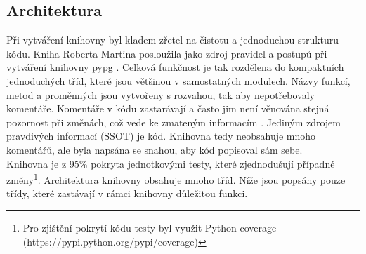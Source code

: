 \documentclass[ing,male,java,dept456]{diploma}						%
\begin{document}
\subsection{Architektura}

Při vytváření knihovny byl kladem zřetel na čistotu a jednoduchou strukturu kódu. Kniha Roberta Martina posloužila jako zdroj pravidel a postupů při vytváření knihovny pypg \cite{cleancode}. Celková funkčnost je tak rozdělena do kompaktních jednoduchých tříd, které jsou většinou v samostatných modulech. Názvy funkcí, metod a proměnných jsou vytvořeny s rozvahou, tak aby nepotřebovaly komentáře. Komentáře v kódu zastarávají a často jim není věnována stejná pozornost při změnách, což vede ke zmateným informacím  \cite{cleancode}. Jediným zdrojem pravdivých informací (SSOT) je kód. Knihovna tedy neobsahuje mnoho komentářů, ale byla napsána se snahou, aby kód popisoval sám sebe. \\
Knihovna je z 95\% pokryta jednotkovými testy, které zjednodušují případné změny\footnote{Pro zjištění pokrytí kódu testy byl využit Python coverage (https://pypi.python.org/pypi/coverage)}. Architektura knihovny obsahuje mnoho tříd. Níže jsou popsány pouze třídy, které zastávají v rámci knihovny důležitou funkci.
\end{document}
